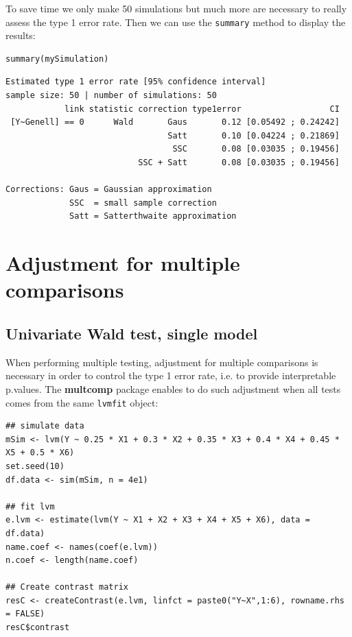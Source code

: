 \documentclass[12pt]{article}
\begin{document}
To save time we only make 50 simulations but much more are necessary
to really assess the type 1 error rate. Then we can use the \texttt{summary}
method to display the results:
\lstset{language=r,label= ,caption= ,captionpos=b,numbers=none}
\begin{lstlisting}
summary(mySimulation)
\end{lstlisting}

\begin{verbatim}
Estimated type 1 error rate [95% confidence interval]
sample size: 50 | number of simulations: 50
            link statistic correction type1error                  CI
 [Y~Genell] == 0      Wald       Gaus       0.12 [0.05492 ; 0.24242]
                                 Satt       0.10 [0.04224 ; 0.21869]
                                  SSC       0.08 [0.03035 ; 0.19456]
                           SSC + Satt       0.08 [0.03035 ; 0.19456]

Corrections: Gaus = Gaussian approximation 
             SSC  = small sample correction 
             Satt = Satterthwaite approximation
\end{verbatim}

\clearpage

\section{Adjustment for multiple comparisons}
\label{sec:org6041710}
\subsection{Univariate Wald test, single model}
\label{sec:org5ca60a6}

When performing multiple testing, adjustment for multiple comparisons
is necessary in order to control the type 1 error rate, i.e. to
provide interpretable p.values. The \textbf{multcomp} package enables to do
such adjustment when all tests comes from the same \texttt{lvmfit} object:
\lstset{language=r,label= ,caption= ,captionpos=b,numbers=none}
\begin{lstlisting}
## simulate data
mSim <- lvm(Y ~ 0.25 * X1 + 0.3 * X2 + 0.35 * X3 + 0.4 * X4 + 0.45 * X5 + 0.5 * X6)
set.seed(10)
df.data <- sim(mSim, n = 4e1)

## fit lvm
e.lvm <- estimate(lvm(Y ~ X1 + X2 + X3 + X4 + X5 + X6), data = df.data)
name.coef <- names(coef(e.lvm))
n.coef <- length(name.coef)

## Create contrast matrix
resC <- createContrast(e.lvm, linfct = paste0("Y~X",1:6), rowname.rhs = FALSE)
resC$contrast
\end{lstlisting}
\end{document}
